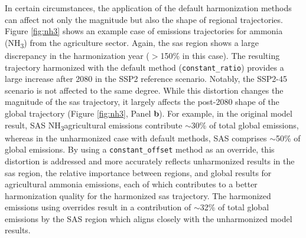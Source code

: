 \documentclass[review]{elsarticle}
\newcommand{\code}[1]{\lstinline[basicstyle=\ttfamily\color{black}]|#1|}
\newcommand{\nht}{NH\textsubscript{3}}
\begin{document}
In certain circumstances, the application of the default harmonization methods
can affect not only the magnitude but also the shape of regional
trajectories. Figure \ref{fig:nh3} shows an example case of emissions
trajectories for ammonia (\nht) from the agriculture sector. Again, the
\gls{sas} region shows a large discrepancy in the harmonization year ($>$150\%
in this case). The resulting trajectory harmonized with the default method
(\code{constant_ratio}) provides a large increase after 2080 in the SSP2
reference scenario. Notably, the SSP2-45 scenario is not affected to the same
degree. While this distortion changes the magnitude of the \gls{sas} trajectory,
it largely affects the post-2080 shape of the global trajectory (Figure
\ref{fig:nh3}, Panel \textbf{b}). For example, in the original model result,
\gls{SAS} \nht agricultural emissions contribute $\sim$30\% of total global
emissions, whereas in the unharmonized case with default methods, \gls{SAS}
comprises $\sim$50\% of global emissions. By using a \code{constant_offset}
method as an override, this distortion is addressed and more accurately reflects
unharmonized results in the \gls{sas} region, the relative importance between
regions, and global results for agricultural ammonia emissions, each of which
contributes to a better harmonization quality for the harmonized \gls{sas}
trajectory. The harmonized emissions using overrides result in a contribution of
$\sim$32\% of total global emissions by the \gls{SAS} region which aligns
closely with the unharmonized model results.
\end{document}
